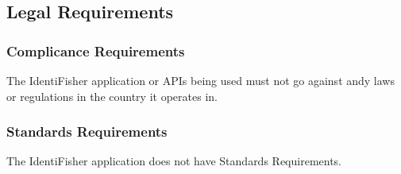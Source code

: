 \documentclass{article}
\begin{document}
\subsection{Legal Requirements}
\subsubsection{Complicance Requirements}
The IdentiFisher application or APIs being used must not go against andy laws or regulations in the country it operates in.
\subsubsection{Standards Requirements}
The IdentiFisher application does not have Standards Requirements.

\newpage
\listoffigures
\end{document}
